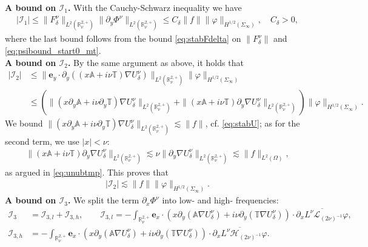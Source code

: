 \documentclass[report]{elsarticle}
\numberwithin{theorem}{section}
\renewcommand{\vec}[1]{\mathbf{#1}}
\begin{document}
\textbf{A bound on $\mathcal{I}_1$. }
With the Cauchy-Schwarz inequality we have 
\begin{align}
	\label{eq:i1}
	\left|\mathcal{I}_1\right|\leq \|F_{\delta}^{\nu}\|_{L^2(\mathbb{R}_{\nu}^{2,+})}\|\partial_y\Phi^{\nu}\|_{L^2(\mathbb{R}_{\nu}^{2,+})}\leq C_{\delta} \|f\|\|\varphi\|_{H^{1/2}(\Sigma_{\infty})},\quad C_{\delta}>0,
\end{align}
where the last bound follows from the bound  \eqref{eq:stabFdelta} on $\|F_{\delta}^{\nu}\|$ and \eqref{eq:psibound_start0_mt}.\\
\textbf{A bound on $\mathcal{I}_2$. }By the same argument as above, it holds that
\begin{align*}
	|\mathcal{I}_2|&\leq \|\vec{e}_y\cdot\partial_y\left((x\mathbb{A}+i\nu\mathbb{T})\nabla U^{\nu}_{\delta}\right)\|_{L^2(\mathbb{R}^{2,+}_{\nu})}\|\varphi\|_{H^{1/2}(\Sigma_{\infty})}\\
	&\leq \left(\|(x\partial_y \mathbb{A}+i\nu\partial_y\mathbb{T})\nabla U^{\nu}_{\delta}\|_{L^2(\mathbb{R}^{2,+}_{\nu})}+
	\|(x\mathbb{A}+i\nu\mathbb{T})\partial_y\nabla U^{\nu}_{\delta}\|_{L^2(\mathbb{R}^{2,+}_{\nu})}\right)\|\varphi\|_{H^{1/2}(\Sigma_{\infty})}.
\end{align*}
We bound $\|(x\partial_y \mathbb{A}+i\nu\partial_y\mathbb{T})\nabla U^{\nu}_{\delta}\|_{L^2(\mathbb{R}^{2,+}_{\nu})}\lesssim \|f\|$, cf. \eqref{eq:stabU}; as for the second term, we use $|x|<\nu$:
\begin{align*}
	\|(x\mathbb{A}+i\nu\mathbb{T})\partial_y\nabla U^{\nu}_{\delta}\|_{L^2(\mathbb{R}^{2,+}_{\nu})}\lesssim \nu\|\partial_y \nabla U^{\nu}_{\delta}\|_{L^2(\mathbb{R}^{2,+}_{\nu})}\lesssim \|f\|_{L^2(\Omega)},
\end{align*}
as argued in \eqref{eq:unubtmp}.  This proves that 
\begin{align}
	\label{eq:i2}
	|\mathcal{I}_2|\lesssim \|f\|\|\varphi\|_{H^{1/2}(\Sigma_{\infty})}.
\end{align}
\textbf{A bound on $\mathcal{I}_3$. }We split the term $\partial_x\Phi^{\nu}$ into low- and high- frequencies:
\begin{align*}
	\mathcal{I}_3&=\mathcal{I}_{3,l}+\mathcal{I}_{3,h},\qquad 
	\mathcal{I}_{3,l}=-\int_{\mathbb{R}^{2,+}_{\nu}}\vec{e}_x\cdot (x\partial_y(\mathbb{A}\nabla U^{\nu}_{\delta})+i\nu\partial_y (\mathbb{T}\nabla U^{\nu}_{\delta}))\cdot\overline{\partial_x L^{\nu}{\mathcal{L}}_{(2\nu)^{-1}}\varphi},\\ 
	\mathcal{I}_{3,h}&=-\int_{\mathbb{R}^{2,+}_{\nu}}\vec{e}_x\cdot (x\partial_y(\mathbb{A}\nabla U^{\nu}_{\delta})+i\nu\partial_y (\mathbb{T}\nabla U^{\nu}_{\delta}))\cdot\overline{\partial_x L^{\nu}{\mathcal{H}}_{(2\nu)^{-1}}{\varphi}}.	
\end{align*}
\end{document}
